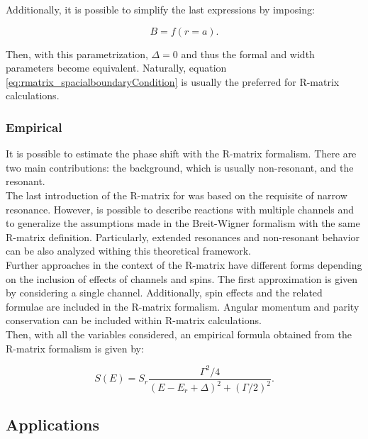 \documentclass[openany]{book}
\begin{document}
Additionally, it is possible to simplify the last expressions by imposing: 

\begin{equation}  \label{eq:rmatrix_spacialboundaryCondition}
	B = f(r = a). 
\end{equation}

Then, with this parametrization, $\Delta = 0$ and thus the formal and width parameters become equivalent. Naturally, equation \ref{eq:rmatrix_spacialboundaryCondition} is usually  the preferred for R-matrix calculations. \\

\subsubsection{Empirical} \label{ssub:rmatrix_phenomenological_empirical}

It is possible to estimate the phase shift with the R-matrix formalism. There are two main contributions: the background, which is usually non-resonant, and the resonant. \\

The last introduction of the R-matrix for was based on the requisite of narrow resonance. However,  is possible to describe reactions with multiple channels and to generalize the assumptions made in the Breit-Wigner formalism with the same R-matrix definition. Particularly, extended resonances and non-resonant behavior can be also analyzed withing this theoretical framework.\\

Further approaches in the context of the R-matrix have different forms depending on the inclusion of effects of channels and spins. The first approximation is given by considering a single channel. Additionally, spin effects and the related formulae are included in the R-matrix formalism. Angular momentum and parity conservation can be included within R-matrix calculations. \\

Then, with all the variables considered, an empirical formula obtained from the R-matrix formalism is given by:

\begin{equation} \label{eq:rmatrix_sfactor}
	S(E) = S_r \frac{\Gamma^2/4}{(E-E_r + \Delta)^2 + (\Gamma/2)^2}.
\end{equation}

\subsection{Applications} \label{sec:Calculable R-matrix}
\end{document}
